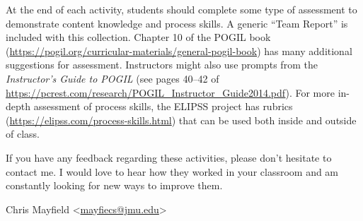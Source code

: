 \bigskip

At the end of each activity, students should complete some type of assessment to demonstrate content knowledge and process skills. A generic ``Team Report'' is included with this collection. Chapter 10 of the POGIL book (\url{https://pogil.org/curricular-materials/general-pogil-book}) has many additional suggestions for assessment. Instructors might also use prompts from the \textit{Instructor's Guide to POGIL} (see pages 40--42 of \url{https://pcrest.com/research/POGIL_Instructor_Guide2014.pdf}). For more in-depth assessment of process skills, the ELIPSS project has rubrics (\url{https://elipss.com/process-skills.html}) that can be used both inside and outside of class.

\bigskip

If you have any feedback regarding these activities, please don't hesitate to contact me. I would love to hear how they worked in your classroom and am constantly looking for new ways to improve them.

\bigskip

\newcommand{\email}[1]{<\href{mailto:#1}{#1}>}

Chris Mayfield \email{mayfiecs@jmu.edu}
